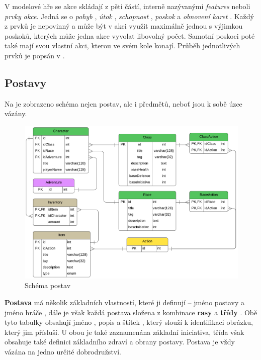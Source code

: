 V modelové hře se akce skládají z pěti částí, interně nazývanými \textit{features} neboli \textit{prvky akce}. Jedná se o \textit{pohyb} , \textit{útok} , \textit{schopnost} , \textit{poskok}  a \textit{obnovení karet} . Každý z prvků je nepovinný a může být v akci využit maximálně jednou s výjimkou poskoků, kterých může jedna akce vyvolat libovolný počet. Samotní poskoci poté také mají svou vlastní akci, kterou ve svém kole konají. Průběh jednotlivých prvků je popsán v .


\subsection{Postavy}
\label{subsec:schema_character}

Na  je zobrazeno schéma nejen postav, ale i předmětů, neboť jsou k sobě úzce vázány. 

\begin{figure}[h]
    \centering
    \includegraphics[width=\textwidth]{../../shared/diagrams/er_character.pdf}
    \caption{Schéma postav}
    \label{diag:er_character}
\end{figure}

\textbf{Postava}  má několik základních vlastností, které ji definují -- jméno postavy  a jméno hráče , dále je však každá postava složena z kombinace \textbf{rasy}  a \textbf{třídy} . Obě tyto tabulky obsahují jméno , popis  a štítek , který slouží k identifikaci obrázku, který jim přísluší. U obou je také zaznamenána základní iniciativa, třída však obsahuje také definici základního zdraví a obrany postavy. Postava je vždy vázána na jedno určité dobrodružství.

